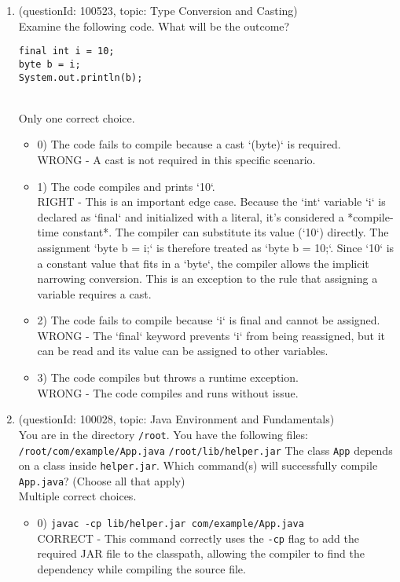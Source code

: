 \documentclass[12pt]{article}
\begin{document}
\begin{enumerate}[label=(\arabic*)]
\begin{itemize}
\end{itemize}
\item (questionId: 100523, topic: Type Conversion and Casting) \\ 
Examine the following code. What will be the outcome?
\begin{verbatim}
final int i = 10;
byte b = i;
System.out.println(b);
\end{verbatim}
\\ \noindent Only one correct choice. 
\begin{itemize}
\item 0) The code fails to compile because a cast `(byte)` is required.
 \\ 
WRONG - A cast is not required in this specific scenario.

\item 1) The code compiles and prints `10`.
 \\ 
RIGHT - This is an important edge case. Because the `int` variable `i` is declared as `final` and initialized with a literal, it's considered a *compile-time constant*. The compiler can substitute its value (`10`) directly. The assignment `byte b = i;` is therefore treated as `byte b = 10;`. Since `10` is a constant value that fits in a `byte`, the compiler allows the implicit narrowing conversion. This is an exception to the rule that assigning a variable requires a cast.

\item 2) The code fails to compile because `i` is final and cannot be assigned.
 \\ 
WRONG - The `final` keyword prevents `i` from being reassigned, but it can be read and its value can be assigned to other variables.

\item 3) The code compiles but throws a runtime exception.
 \\ 
WRONG - The code compiles and runs without issue.

\end{itemize}
\item (questionId: 100028, topic: Java Environment and Fundamentals) \\ 
You are in the directory \verb|/root|. You have the following files:
\verb|/root/com/example/App.java|
\verb|/root/lib/helper.jar|
The class \verb|App| depends on a class inside \verb|helper.jar|. Which command(s) will successfully compile \verb|App.java|? (Choose all that apply)
\\ \noindent Multiple correct choices. 
\begin{itemize}
\item 0) \verb|javac -cp lib/helper.jar com/example/App.java|
 \\ 
CORRECT - This command correctly uses the \verb|-cp| flag to add the required JAR file to the classpath, allowing the compiler to find the dependency while compiling the source file.


\end{itemize}
\end{enumerate}
\end{document}
